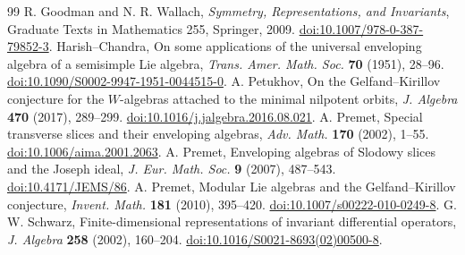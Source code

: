 \documentclass[11pt,a4paper]{article}
\theoremstyle{definition}
\begin{document}
\begin{thebibliography}{99}
 R. Goodman and N. R. Wallach,
\emph{Symmetry, Representations, and Invariants}, Graduate Texts in Mathematics 255, Springer, 2009.
\href{https://doi.org/10.1007/978-0-387-79852-3}{doi:10.1007/978-0-387-79852-3}.
 Harish--Chandra, On some applications of the universal enveloping algebra of a semisimple Lie algebra, \emph{Trans. Amer. Math. Soc.} \textbf{70} (1951), 28--96. \href{https://doi.org/10.1090/S0002-9947-1951-0044515-0}{doi:10.1090/S0002-9947-1951-0044515-0}.
 A. Petukhov,
On the Gelfand--Kirillov conjecture for the \(W\)-algebras attached to the minimal nilpotent orbits, \emph{J. Algebra} \textbf{470} (2017), 289--299.
\href{https://doi.org/10.1016/j.jalgebra.2016.08.021}{doi:10.1016/j.jalgebra.2016.08.021}.
 A. Premet, Special transverse slices and their enveloping algebras, \emph{Adv. Math.} \textbf{170} (2002), 1--55. \href{https://doi.org/10.1006/aima.2001.2063}{doi:10.1006/aima.2001.2063}.
 A. Premet,
Enveloping algebras of Slodowy slices and the Joseph ideal,
\emph{J. Eur. Math. Soc.} \textbf{9} (2007), 487--543.
\href{https://doi.org/10.4171/JEMS/86}{doi:10.4171/JEMS/86}.
 A. Premet,
Modular Lie algebras and the Gelfand--Kirillov conjecture,
\emph{Invent. Math.} \textbf{181} (2010), 395--420.
\href{https://doi.org/10.1007/s00222-010-0249-8}{doi:10.1007/s00222-010-0249-8}.
 G. W. Schwarz,
Finite-dimensional representations of invariant differential operators,
\emph{J. Algebra} \textbf{258} (2002), 160--204.
\href{https://doi.org/10.1016/S0021-8693(02)00500-8}{doi:10.1016/S0021-8693(02)00500-8}.
\end{thebibliography}
\end{document}
